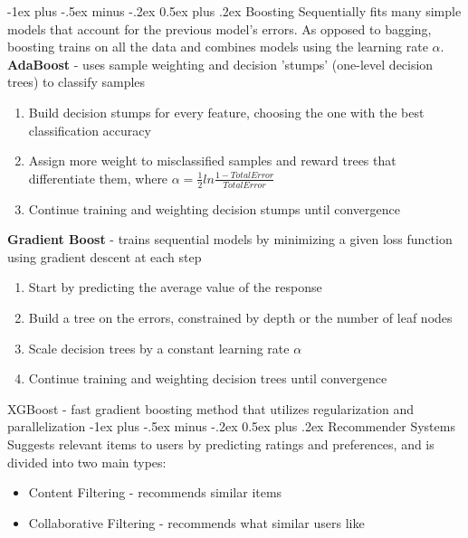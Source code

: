 \documentclass[10pt,landscape]{article}
\makeatletter
\renewcommand{\section}{\@startsection{section}{1}{0mm}%
                                {-1ex plus -.5ex minus -.2ex}%
                                {0.5ex plus .2ex}%
                                {\normalfont\large\bfseries}}
\makeatother
\begin{document}
\begin{multicols}{3}
    \section{Boosting}
    Sequentially fits many simple models that account for the previous model's errors. As opposed to bagging, boosting trains on all the data and combines models using the learning rate $\alpha$. \\
    \smallskip
    \textbf{AdaBoost} - uses sample weighting and decision 'stumps' (one-level decision trees) to classify samples
    \begin{enumerate}[leftmargin=5mm]
        \itemsep -.4mm
        \item Build decision stumps for every feature, choosing the one with the best classification accuracy
        \item Assign more weight to misclassified samples and reward trees that differentiate them, where  $\alpha = \frac{1}{2}ln\frac{1-TotalError}{TotalError}$
        \item Continue training and weighting decision stumps until convergence
    \end{enumerate}

    \textbf{Gradient Boost} - trains sequential models by minimizing a given loss function using gradient descent at each step
    \begin{enumerate}[leftmargin=5mm]
        \itemsep -.4mm
        \item Start by predicting the average value of the response
        \item Build a tree on the errors, constrained by depth or the number of leaf nodes
        \item Scale decision trees by a constant learning rate $\alpha$
        \item Continue training and weighting decision trees until convergence
    \end{enumerate}

    XGBoost - fast gradient boosting method that utilizes regularization and parallelization
    \section{Recommender Systems}
    Suggests relevant items to users by predicting ratings and preferences, and is divided into two main types:
    \begin{itemize}[label={--},leftmargin=4mm]
        \itemsep -.4mm
        \item Content Filtering - recommends similar items
        \item Collaborative Filtering - recommends what similar users like
    \end{itemize}


\end{multicols}
\end{document}
